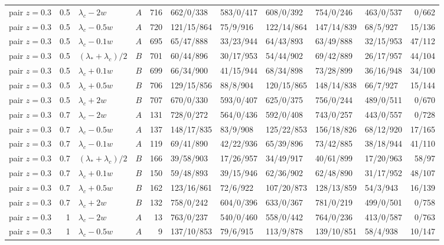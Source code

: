 \begin{longtable}{@{}lrllrlllllr@{}}
pair $z{=}0.3$ & 0.5 & $\lambda_c-2w$ & $A$ & 716 & 662/0/338 & 583/0/417 & 608/0/392 & 754/0/246 & 463/0/537 & 0/662\\
pair $z{=}0.3$ & 0.5 & $\lambda_c-0.5w$ & $A$ & 720 & 121/15/864 & 75/9/916 & 122/14/864 & 147/14/839 & 68/5/927 & 15/136\\
pair $z{=}0.3$ & 0.5 & $\lambda_c-0.1w$ & $A$ & 695 & 65/47/888 & 33/23/944 & 64/43/893 & 63/49/888 & 32/15/953 & 47/112\\
pair $z{=}0.3$ & 0.5 & $(\lambda_*+\lambda_c)/2$ & $B$ & 701 & 60/44/896 & 30/17/953 & 54/44/902 & 69/42/889 & 26/17/957 & 44/104\\
pair $z{=}0.3$ & 0.5 & $\lambda_c+0.1w$ & $B$ & 699 & 66/34/900 & 41/15/944 & 68/34/898 & 73/28/899 & 36/16/948 & 34/100\\
pair $z{=}0.3$ & 0.5 & $\lambda_c+0.5w$ & $B$ & 706 & 129/15/856 & 88/8/904 & 120/15/865 & 148/14/838 & 66/7/927 & 15/144\\
pair $z{=}0.3$ & 0.5 & $\lambda_c+2w$ & $B$ & 707 & 670/0/330 & 593/0/407 & 625/0/375 & 756/0/244 & 489/0/511 & 0/670\\
pair $z{=}0.3$ & 0.7 & $\lambda_c-2w$ & $A$ & 131 & 728/0/272 & 564/0/436 & 592/0/408 & 743/0/257 & 443/0/557 & 0/728\\
pair $z{=}0.3$ & 0.7 & $\lambda_c-0.5w$ & $A$ & 137 & 148/17/835 & 83/9/908 & 125/22/853 & 156/18/826 & 68/12/920 & 17/165\\
pair $z{=}0.3$ & 0.7 & $\lambda_c-0.1w$ & $A$ & 119 & 69/41/890 & 42/22/936 & 65/39/896 & 73/42/885 & 38/18/944 & 41/110\\
pair $z{=}0.3$ & 0.7 & $(\lambda_*+\lambda_c)/2$ & $B$ & 166 & 39/58/903 & 17/26/957 & 34/49/917 & 40/61/899 & 17/20/963 & 58/97\\
pair $z{=}0.3$ & 0.7 & $\lambda_c+0.1w$ & $B$ & 150 & 59/48/893 & 39/15/946 & 62/36/902 & 62/48/890 & 31/17/952 & 48/107\\
pair $z{=}0.3$ & 0.7 & $\lambda_c+0.5w$ & $B$ & 162 & 123/16/861 & 72/6/922 & 107/20/873 & 128/13/859 & 54/3/943 & 16/139\\
pair $z{=}0.3$ & 0.7 & $\lambda_c+2w$ & $B$ & 132 & 758/0/242 & 604/0/396 & 633/0/367 & 781/0/219 & 499/0/501 & 0/758\\
pair $z{=}0.3$ & 1 & $\lambda_c-2w$ & $A$ & 13 & 763/0/237 & 540/0/460 & 558/0/442 & 764/0/236 & 413/0/587 & 0/763\\
pair $z{=}0.3$ & 1 & $\lambda_c-0.5w$ & $A$ & 9 & 137/10/853 & 79/6/915 & 113/9/878 & 139/10/851 & 58/4/938 & 10/147\\

\end{longtable}
